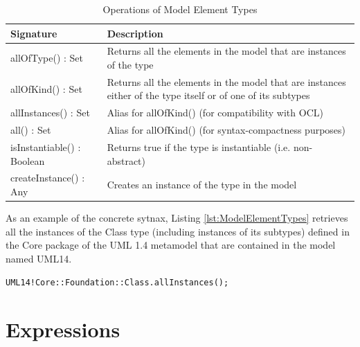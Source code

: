 \begin{longtable} {|p{5.5cm}|p{6.5cm}|}
			
			\caption{Operations of Model Element Types}
			\label{tab:ModelElementTypesOperations}\\
			
			\hline
			
			\textbf{Signature} & \textbf{Description} \\\hline
			
			allOfType() : Set & Returns all the elements in the model that are instances of the type \\\hline
			
			allOfKind() : Set & Returns all the elements in the model that are instances either of the type itself or of one of its subtypes  \\\hline

			allInstances() : Set & Alias for allOfKind() (for compatibility with OCL) \\\hline
						
			all() : Set & Alias for allOfKind() (for syntax-compactness purposes) \\\hline
			
			isInstantiable() : Boolean & Returns true if the type is instantiable (i.e. non-abstract)  \\\hline
			
			createInstance() : Any & Creates an instance of the type in the model \\\hline
			
\end{longtable}

As an example of the concrete sytnax, Listing \ref{lst:ModelElementTypes} retrieves all the instances of the Class type (including instances of its subtypes) defined in the Core package of the UML 1.4 metamodel that are contained in the model named UML14.

\begin{lstlisting}[basicstyle=\ttfamily\footnotesize, flexiblecolumns=true, numbers=none, nolol=true, caption=Demonstration of the concrete syntax for accessing model element types, label=lst:ModelElementTypes, numbers=left, language=EOL, tabsize=2]
UML14!Core::Foundation::Class.allInstances();
\end{lstlisting}

\section{Expressions}

